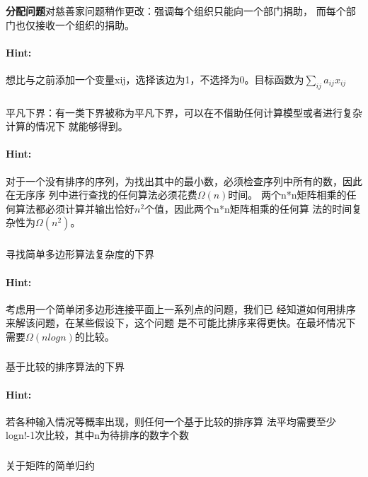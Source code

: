 \documentclass{article}
\begin{document}
     \subsubsection{}\textbf{分配问题}对慈善家问题稍作更改：强调每个组织只能向一个部门捐助，
而每个部门也仅接收一个组织的捐助。

     \paragraph{Hint:}想比与之前添加一个变量xij，选择该边为1，不选择为0。目标函数为$\sum_{ij}a_{ij}x_{ij}$
     
     \subsubsection{}平凡下界：有一类下界被称为平凡下界，可以在不借助任何计算模型或者进行复杂计算的情况下
就能够得到。
     \paragraph{Hint:}对于一个没有排序的序列，为找出其中的最小数，必须检查序列中所有的数，因此在无序序
列中进行查找的任何算法必须花费$\Omega(n)$时间。
两个n*n矩阵相乘的任何算法都必须计算并输出恰好$n^2$个值，因此两个n*n矩阵相乘的任何算
法的时间复杂性为$\Omega(n^2)$。

     
     \subsubsection{}寻找简单多边形算法复杂度的下界
     \paragraph{Hint:}考虑用一个简单闭多边形连接平面上一系列点的问题，我们已
经知道如何用排序来解该问题，在某些假设下，这个问题
是不可能比排序来得更快。在最坏情况下需要$\Omega(nlogn)$的比较。
     
     \subsubsection{}基于比较的排序算法的下界
     \paragraph{Hint:}若各种输入情况等概率出现，则任何一个基于比较的排序算
法平均需要至少logn!-1次比较，其中n为待排序的数字个数


     \subsubsection{}关于矩阵的简单归约
\end{document}
